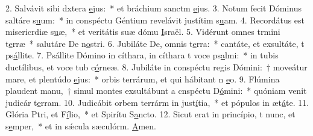 2. Salvávit sibi dxtera \uline{e}jus:~* et bráchium sanctm \uline{e}jus.
3. Notum fecit Dóminus saltáre s\uline{u}um:~* in conspéctu Géntium revelávit justítim s\uline{u}am.
4. Recordátus est misericrdiæ s\uline{u}æ,~* et veritátis suæ dómu \uline{I}sraël.
5. Vidérunt omnes trmini t\uline{e}rræ~* salutáre De n\uline{o}stri.
6. Jubiláte De, omnis t\uline{e}rra:~* cantáte, et exsultáte, t ps\uline{á}llite.
7. Psállite Dómino in cíthara, in cíthara t voce ps\uline{a}lmi:~* in tubis ductílibus, et voce tub c\uline{ó}rneæ.
8. Jubiláte in conspéctu regis Dómini:~† moveátur mare, et plentúdo \uline{e}jus:~* orbis terrárum, et qui hábitant n \uline{e}o.
9. Flúmina plaudent manu,~† simul montes exsultábunt a cnspéctu D\uline{ó}mini:~* quóniam venit judicár t\uline{e}rram.
10. Judicábit orbem terrárm in just\uline{í}tia,~* et pópulos in æt\uline{á}te.
11. Glória Ptri, et F\uline{í}lio,~* et Spirítu S\uline{a}ncto.
12. Sicut erat in princípio, t nunc, et s\uline{e}mper,~* et in sǽcula sæculórm. \uline{A}men.
